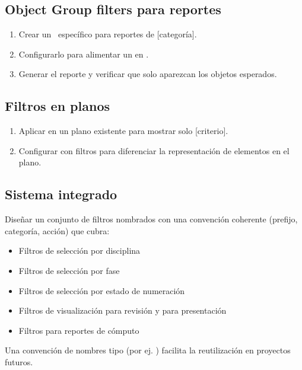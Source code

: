\documentclass[11pt,a4paper]{article}
\begin{document}
\subsection{Object Group filters para reportes}
\begin{enumerate}
    \item Crear un \OG\ específico para reportes de [categoría].
    \item Configurarlo para alimentar un  en .
    \item Generar el reporte y verificar que solo aparezcan los objetos esperados.
\end{enumerate}

\subsection{Filtros en planos}
\begin{enumerate}
    \item Aplicar  en un plano existente para mostrar solo [criterio].
    \item Configurar  con filtros para diferenciar la representación de elementos en el plano.
\end{enumerate}

\subsection{Sistema integrado}
Diseñar un conjunto de filtros nombrados con una convención coherente (prefijo, categoría, acción) que cubra:
\begin{itemize}
    \item Filtros de selección por disciplina
    \item Filtros de selección por fase
    \item Filtros de selección por estado de numeración
    \item Filtros de visualización para revisión y para presentación
    \item Filtros para reportes de cómputo
\end{itemize}

\begin{tip}
Una convención de nombres tipo \arch{[disciplina]\_[criterio]\_[acción]} (por ej. ) facilita la reutilización en proyectos futuros.
\end{tip}

\end{document}

